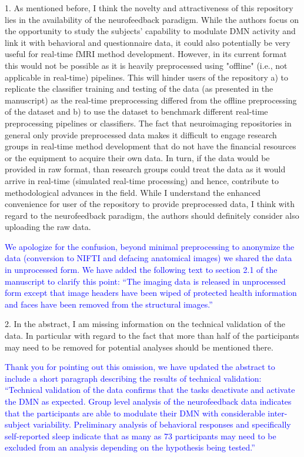 \documentclass{article}
\newcommand{\RESPONSE}[1]{\textcolor{blue}{#1}}
\begin{document}
1. As mentioned before, I think the novelty and attractiveness of this repository lies in the availability of the neurofeedback paradigm. While the authors focus on the opportunity to study the subjects' capability to modulate DMN activity and link it with behavioral and questionnaire data, it could also potentially be very useful for real-time fMRI method development. However, in its current format this would not be possible as it is heavily preprocessed using "offline" (i.e., not applicable in real-time) pipelines. This will hinder users of the repository a) to replicate the classifier training and testing of the data (as presented in the manuscript) as the real-time preprocessing differed from the offline preprocessing of the dataset and b) to use the dataset to benchmark different real-time preprocessing pipelines or classifiers. The fact that neuroimaging repositories in general only provide preprocessed data makes it difficult to engage research groups in real-time method development that do not have the financial resources or the equipment to acquire their own data. In turn, if the data would be provided in raw format, than research groups could treat the data as it would arrive in real-time (simulated real-time processing) and hence, contribute to methodological advances in the field. While I understand the enhanced convenience for user of the repository to provide preprocessed data, I think with regard to the neurofeedback paradigm, the authors should definitely consider also uploading the raw data.

\RESPONSE{We apologize for the confusion, beyond minimal preprocessing to anonymize the data (conversion to NIFTI and defacing anatomical images) we shared the data in unprocessed form. We have added the following text to section 2.1 of the manuscript to clarify this point: ``The imaging data is released in unprocessed form except that image headers have been wiped of protected health information and faces have been removed from the structural images.''}

2. In the abstract, I am missing information on the technical validation of the data. In particular with regard to the fact that more than half of the participants may need to be removed for potential analyses should be mentioned there.

\RESPONSE{Thank you for pointing out this omission, we have updated the abstract to include a short paragraph describing the results of technical validation: ``Technical validation of the data confirms that the tasks deactivate and activate the DMN as expected. Group level analysis of the neurofeedback data indicates that the participants are able to modulate their DMN with considerable inter-subject variability. Preliminary analysis of behavioral responses and specifically self-reported sleep indicate that as many as 73 participants may need to be excluded from an analysis depending on the hypothesis being tested.''}
\end{document}
